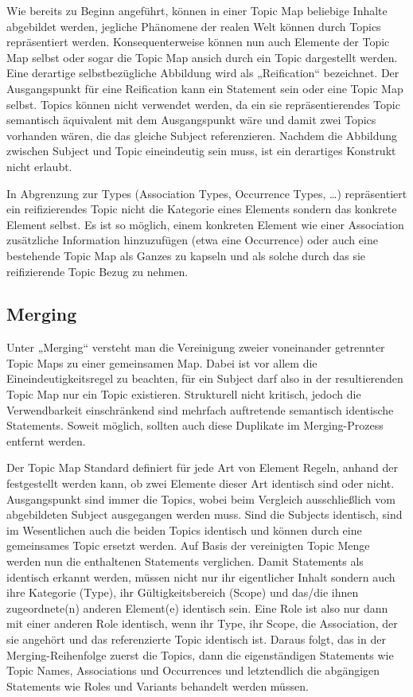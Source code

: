Wie bereits zu Beginn angeführt, können in einer Topic Map beliebige Inhalte abgebildet werden, jegliche Phänomene der realen Welt können durch Topics repräsentiert werden. Konsequenterweise können nun auch Elemente der Topic Map selbst oder sogar die Topic Map ansich durch ein Topic dargestellt werden. Eine derartige selbstbezügliche Abbildung wird als „Reification“ bezeichnet. Der Ausgangspunkt für eine Reification kann ein Statement sein oder eine Topic Map selbst. Topics können nicht verwendet werden, da ein sie repräsentierendes Topic semantisch äquivalent mit dem Ausgangspunkt wäre und damit zwei Topics vorhanden wären, die das gleiche Subject referenzieren. Nachdem die Abbildung zwischen Subject und Topic eineindeutig sein muss, ist ein derartiges Konstrukt nicht erlaubt.

In Abgrenzung zur Types (Association Types, Occurrence Types, \ldots) repräsentiert ein reifizierendes Topic nicht die Kategorie eines Elements sondern das konkrete Element selbst. Es ist so möglich, einem konkreten Element wie einer Association zusätzliche Information hinzuzufügen (etwa eine Occurrence) oder auch eine bestehende Topic Map als Ganzes zu kapseln und als solche durch das sie reifizierende Topic Bezug zu nehmen. 


\subsection{Merging} %
\label{ssub:merging}

Unter „Merging“ versteht man die Vereinigung zweier voneinander getrennter Topic Maps zu einer gemeinsamen Map. Dabei ist vor allem die Eineindeutigkeitsregel zu beachten, für ein Subject darf also in der resultierenden Topic Map nur ein Topic existieren. Strukturell nicht kritisch, jedoch die Verwendbarkeit einschränkend sind mehrfach auftretende semantisch identische Statements. Soweit möglich, sollten auch diese Duplikate im Merging-Prozess entfernt werden.

Der Topic Map Standard definiert für jede Art von Element Regeln, anhand der festgestellt werden kann, ob zwei Elemente dieser Art identisch sind oder nicht. Ausgangspunkt sind immer die Topics, wobei beim Vergleich ausschließlich vom abgebildeten Subject ausgegangen werden muss. Sind die Subjects identisch, sind im Wesentlichen auch die beiden Topics identisch und können durch eine gemeinsames Topic ersetzt werden. Auf Basis der vereinigten Topic Menge werden nun die enthaltenen Statements verglichen. Damit Statements als identisch erkannt werden, müssen nicht nur ihr eigentlicher Inhalt sondern auch ihre Kategorie (Type), ihr Gültigkeitsbereich (Scope) und das/die ihnen zugeordnete(n) anderen Element(e) identisch sein. Eine Role ist also nur dann mit einer anderen Role identisch, wenn ihr Type, ihr Scope, die Association, der sie angehört und das referenzierte Topic identisch ist. Daraus folgt, das in der Merging-Reihenfolge zuerst die Topics, dann die eigenständigen Statements wie Topic Names, Associations und Occurrences und letztendlich die abgängigen Statements wie Roles und Variants behandelt werden müssen.

